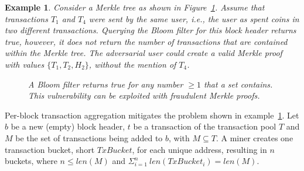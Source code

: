 \documentclass[conference]{IEEEtran}
\newtheorem{example}{Example}[section]
\begin{document}
\begin{example}
\label{ex:FraudMerkleProof}
Consider a Merkle tree as shown in Figure~\ref{fig:FraudMerkleProof}. Assume that transactions $T_1$ and $T_4$ were sent by the same user, i.e., the user as spent coins in two different transactions. Querying the Bloom filter for this block header returns \textit{true}, however, it does not return the number of transactions that are contained within the Merkle tree. The adversarial user could create a valid Merkle proof with values $\{T_1, T_2, H_2\}$, without the mention of $T_4$. 
\begin{figure}[hbt]
\centering
{}  
\caption{A Bloom filter returns true for any number $\geq 1$ that a set contains. This vulnerability can be exploited with fraudulent Merkle proofs.\label{fig:FraudMerkleProof}}
\end{figure}
\end{example}

Per-block transaction aggregation mitigates the problem shown in example~\ref{ex:FraudMerkleProof}. Let $b$ be a new (empty) block header, $t$ be a transaction of the transaction pool $T$ and $M$ be the set of transactions being added to $b$, with $M \subseteq T$. A miner creates one transaction bucket, short $TxBucket$, for each unique address, resulting in $n$ buckets, where $n \leq len(M)$ and $\Sigma^n_{i = 1}\ len(TxBucket_i) = len(M)$. 
\end{document}
